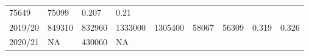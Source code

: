\documentclass[
  spanish,
]{article}
\begin{document}
\begin{longtable}[]{@{}lllllllll@{}}
\begin{minipage}[t]{0.08\columnwidth}
75649\strut
\end{minipage} & \begin{minipage}[t]{0.09\columnwidth}\raggedright
75099\strut
\end{minipage} & \begin{minipage}[t]{0.08\columnwidth}\raggedright
0.207\strut
\end{minipage} & \begin{minipage}[t]{0.09\columnwidth}\raggedright
0.21\strut
\end{minipage}\tabularnewline
\begin{minipage}[t]{0.06\columnwidth}\raggedright
2019/20\strut
\end{minipage} & \begin{minipage}[t]{0.09\columnwidth}\raggedright
849310\strut
\end{minipage} & \begin{minipage}[t]{0.10\columnwidth}\raggedright
832960\strut
\end{minipage} & \begin{minipage}[t]{0.09\columnwidth}\raggedright
1333000\strut
\end{minipage} & \begin{minipage}[t]{0.10\columnwidth}\raggedright
1305400\strut
\end{minipage} & \begin{minipage}[t]{0.08\columnwidth}\raggedright
58067\strut
\end{minipage} & \begin{minipage}[t]{0.09\columnwidth}\raggedright
56309\strut
\end{minipage} & \begin{minipage}[t]{0.08\columnwidth}\raggedright
0.319\strut
\end{minipage} & \begin{minipage}[t]{0.09\columnwidth}\raggedright
0.326\strut
\end{minipage}\tabularnewline
\begin{minipage}[t]{0.06\columnwidth}\raggedright
2020/21\strut
\end{minipage} & \begin{minipage}[t]{0.09\columnwidth}\raggedright
NA\strut
\end{minipage} & \begin{minipage}[t]{0.10\columnwidth}\raggedright
430060\strut
\end{minipage} & \begin{minipage}[t]{0.09\columnwidth}\raggedright
NA\strut
\end{minipage} & \begin{minipage}[t]{0.10\columnwidth}\raggedright

\end{minipage}
\end{longtable}
\end{document}
